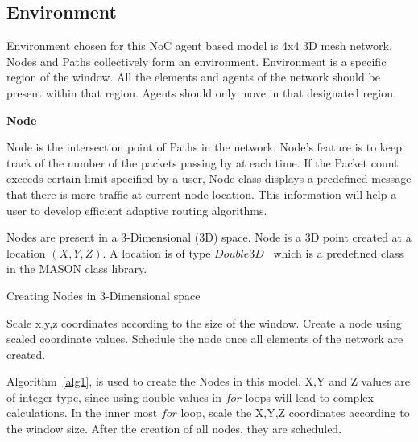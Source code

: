 \subsection{Environment}
\vspace{5mm}

Environment chosen for this NoC agent based model is 4x4 3D mesh network. Nodes and Paths collectively form an environment. Environment is a  specific region of the window. All the elements and agents of the network should be present within that region. Agents should only move in that designated region. 

\vspace{0.5cm}
\vspace{10mm}
\noindent\textbf{Node}
\vspace{5mm}

\noindent Node is the intersection point of Paths in the network. Node's feature is to keep track of the number of the packets passing by at each time. If the Packet count exceeds certain limit specified by a user, Node class displays a predefined message that there is more traffic at current node location. This information will help a user to develop efficient adaptive routing algorithms.

Nodes are present in a 3-Dimensional (3D) space. Node is a 3D point created at a location $(X,Y,Z)$. A location is of type $Double3D$~\cite{Double3D} which is a predefined class in the MASON class library. 

\vspace{10mm}
\begin{algorithm}[H]
\small %
\caption{Creating Nodes in 3-Dimensional space}
\label{alg1}
\begin{boxedminipage}{150mm}
\vspace{5mm}
\begin{algorithmic}[1]
\State Scale x,y,z coordinates according to the size of the window.
\State Create a node using scaled coordinate values.
\State Schedule the node once all elements of the network are created.
\EndFor
\EndFor
\EndFor
\end{algorithmic}
\vspace{5mm}
\end{boxedminipage}
\end{algorithm}
\vspace{5mm}

Algorithm~\ref{alg1}, is used to create the Nodes in this model. X,Y and Z values are of integer type, since using double values in $for$ loops will lead to complex calculations. In the inner most $for$ loop, scale the X,Y,Z coordinates according to the window size. After the creation of all nodes, they are scheduled.

